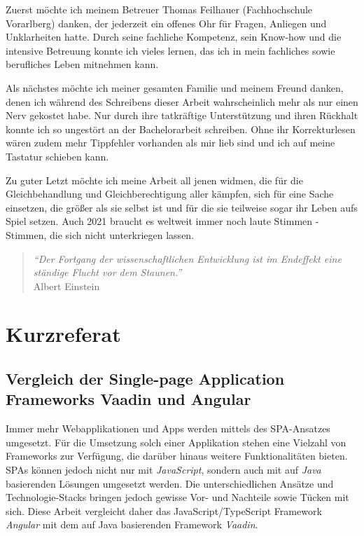 \documentclass[a4paper,12pt,twoside]{scrreprt}
\begin{document}
\medskip

Zuerst möchte ich meinem Betreuer Thomas Feilhauer (Fachhochschule Vorarlberg) danken, der jederzeit ein offenes Ohr für Fragen, Anliegen und Unklarheiten hatte. Durch seine fachliche Kompetenz, sein Know-how und die intensive Betreuung konnte ich vieles lernen, das ich in mein fachliches sowie berufliches Leben mitnehmen kann.

\medskip

Als nächstes möchte ich meiner gesamten Familie und meinem Freund danken, denen ich während des Schreibens dieser Arbeit wahrscheinlich mehr als nur einen Nerv gekostet habe. Nur durch ihre tatkräftige Unterstützung und ihren Rückhalt konnte ich so ungestört an der Bachelorarbeit schreiben. Ohne ihr Korrekturlesen wären zudem mehr Tippfehler vorhanden als mir lieb sind und ich auf meine Tastatur schieben kann.

\medskip

Zu guter Letzt möchte ich meine Arbeit all jenen widmen, die für die Gleichbehandlung und Gleichberechtigung aller kämpfen, sich für eine Sache einsetzen, die größer als sie selbst ist und für die sie teilweise sogar ihr Leben aufs Spiel setzen. Auch 2021 braucht es weltweit immer noch laute Stimmen - Stimmen, die sich nicht unterkriegen lassen.

\bigskip

\begin{quote}
    \begin{flushright}
        \textit{\enquote{Der Fortgang der wissenschaftlichen Entwicklung ist im Endeffekt eine ständige Flucht vor dem Staunen.}}\\
        Albert Einstein
    \end{flushright}
\end{quote}

\newpage
\section*{Kurzreferat}
\label{sec:kurzreferat}

\subsection*{Vergleich der Single-page Application Frameworks Vaadin und Angular}

Immer mehr Webapplikationen und Apps werden mittels des \acs{SPA}-Ansatzes umgesetzt. Für die Umsetzung solch einer Applikation stehen eine Vielzahl von Frameworks zur Verfügung, die darüber hinaus weitere Funktionalitäten bieten. \acsp{SPA} können jedoch nicht nur mit \textit{JavaScript}, sondern auch mit auf \textit{Java} basierenden Lösungen umgesetzt werden. Die unterschiedlichen Ansätze und Technologie-Stacks bringen jedoch gewisse Vor- und Nachteile sowie Tücken mit sich. Diese Arbeit vergleicht daher das JavaScript/TypeScript Framework \textit{Angular} mit dem auf Java basierenden Framework \textit{Vaadin}.
\end{document}
